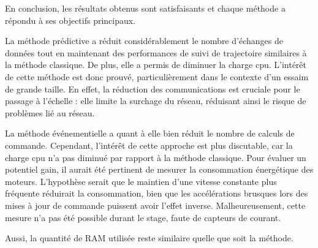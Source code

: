 En conclusion, les résultats obtenus sont satisfaisants et chaque méthode a répondu à ses objectifs principaux.

La méthode prédictive a réduit considérablement le nombre d'échanges de données tout en maintenant des performances de suivi de trajectoire similaires à la méthode classique. De plus, elle a permis de diminuer la charge \gls{cpu}. L'intérêt de cette méthode est donc prouvé, particulièrement dans le contexte d'un essaim de grande taille. En effet, la réduction des communications est cruciale pour le passage à l'échelle : elle limite la surchage du réseau, réduisant ainsi le risque de problèmes lié au réseau.

La méthode événementielle a quant à elle bien réduit le nombre de calculs de commande. Cependant, l'intérêt de cette approche est plus discutable, car la charge \gls{cpu} n'a pas diminué par rapport à la méthode classique. Pour évaluer un potentiel gain, il aurait été pertinent de mesurer la consommation énergétique des moteurs. L'hypothèse serait que le maintien d'une vitesse constante plus fréquente réduirait la consommation, bien que les accélérations brusques lors des mises à jour de commande puissent avoir l'effet inverse. Malheureusement, cette mesure n'a pas été possible durant le stage, faute de capteurs de courant. 

\noindent Aussi, la quantité de RAM utilisée reste similaire quelle que soit la méthode. %

